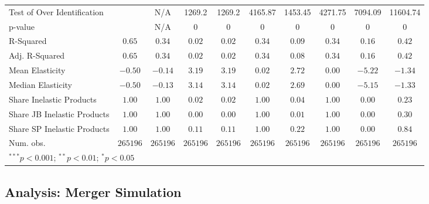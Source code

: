 \documentclass{article}
\begin{document}
\begin{table}
{\begin{tabular}{l c c c c c c c c c}
Test of Over Identification &               & N/A           & 1269.2        & 1269.2        & 4165.87       & 1453.45       & 4271.75       & 7094.09       & 11604.74      \\
p-value                     &               & N/A           & 0             & 0             & 0             & 0             & 0             & 0             & 0             \\
R-Squared                   & $0.65$        & $0.34$        & $0.02$        & $0.02$        & $0.34$        & $0.09$        & $0.34$        & $0.16$        & $0.42$        \\
Adj. R-Squared              & $0.65$        & $0.34$        & $0.02$        & $0.02$        & $0.34$        & $0.08$        & $0.34$        & $0.16$        & $0.42$        \\
Mean Elasticity             & $-0.50$       & $-0.14$       & $3.19$        & $3.19$        & $0.02$        & $2.72$        & $0.00$        & $-5.22$       & $-1.34$       \\
Median Elasticity           & $-0.50$       & $-0.13$       & $3.14$        & $3.14$        & $0.02$        & $2.69$        & $0.00$        & $-5.15$       & $-1.33$       \\
Share Inelastic Products    & $1.00$        & $1.00$        & $0.02$        & $0.02$        & $1.00$        & $0.04$        & $1.00$        & $0.00$        & $0.23$        \\
Share JB Inelastic Products & $1.00$        & $1.00$        & $0.00$        & $0.00$        & $1.00$        & $0.01$        & $1.00$        & $0.00$        & $0.30$        \\
Share SP Inelastic Products & $1.00$        & $1.00$        & $0.11$        & $0.11$        & $1.00$        & $0.22$        & $1.00$        & $0.00$        & $0.84$        \\
Num. obs.                   & $265196$      & $265196$      & $265196$      & $265196$      & $265196$      & $265196$      & $265196$      & $265196$      & $265196$      \\
\bottomrule
\multicolumn{10}{l}{\scriptsize{$^{***}p<0.001$; $^{**}p<0.01$; $^{*}p<0.05$}}
\end{tabular}
    }
\end{table}

\FloatBarrier

\subsection{Analysis: Merger Simulation}
\end{document}
